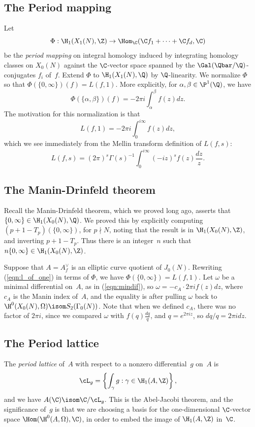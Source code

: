 \documentclass{report}
\begin{document}
\subsection{The Period mapping}
Let
$$
\Phi:\H_1(X_1(N),\Z) \to \Hom_\C(\C f_1 + \cdots + \C f_d,\C)
$$
be the {\em period mapping} on integral homology induced by
integrating homology classes on $X_0(N)$ against the $\C$-vector space
spanned by the $\Gal(\Qbar/\Q)$-conjugates $f_i$ of~$f$.
Extend $\Phi$ to $\H_1(X_1(N),\Q)$ by $\Q$-linearity.
We normalize
$\Phi$ so that $\Phi(\{0,\infty\})(f) = L(f,1)$.  More explicitly, for
$\alpha,\beta\in\P^1(\Q)$, we have
$$
  \Phi(\{\alpha,\beta\})(f) = -2\pi i \int_{\alpha}^{\beta} f(z) dz.
$$
The motivation for this normalization is that
\begin{equation}\label{eqn:l_of_one}
  L(f,1) = -2\pi i \int_{0}^{i\infty}  f(z) dz,
\end{equation}
which we see immediately from the Mellin transform definition of $L(f,s)$:
$$
  L(f,s) = (2\pi)^s\Gamma(s)^{-1}\int_{0}^{i\infty} (-iz)^s f(z) \frac{dz}{z}.
$$


\subsection{The Manin-Drinfeld theorem}
Recall the Manin-Drinfeld theorem, which we proved long ago, asserts
that $\{0,\infty\} \in \H_1(X_0(N),\Q)$.  We proved this by explicitly
computing $(p+1-T_p)(\{0,\infty\})$, for $p\nmid N$, noting that the
result is in $\H_1(X_0(N),\Z)$, and inverting $p+1-T_p$.  Thus there
is an integer~$n$ such that $n\{0,\infty\} \in \H_1(X_0(N),\Z)$.

Suppose that $A=A_f^{\vee}$ is an elliptic curve quotient of $J_0(N)$.
Rewriting (\ref{eqn:l_of_one}) in terms of $\Phi$, we have
$\Phi(\{0,\infty\}) = L(f,1)$.  Let $\omega$ be a minimal differential
on~$A$, as in (\ref{eqn:mindif}), so $\omega = -c_A \cdot 2\pi i
f(z)dz$, where $c_A$ is the Manin index of~$A$, and the equality is
after pulling $\omega$ back to $\H^0(X_0(N),\Omega) \isom
S_2(\Gamma_0(N))$.  Note that when we defined $c_A$, there was no
factor of $2\pi i$, since we compared $\omega$ with $f(q)
\frac{dq}{q}$, and $q=e^{2\pi i z}$, so $dq/q = 2\pi i dz.$

\subsection{The Period lattice}
The {\em period lattice} of~$A$ with respect to a nonzero differential~$g$ on~$A$ is
$$
\cL_g = \left\{\int_{\gamma} g : \gamma\in\H_1(A,\Z)\right\},
$$
and we have $A(\C)\isom \C/\cL_g$.  This is the Abel-Jacobi
theorem, and the significance of~$g$ is that we are choosing a basis
for the one-dimensional $\C$-vector space $\Hom(\H^0(A,\Omega),\C)$,
in order to embed the image of $\H_1(A,\Z)$ in~$\C$.
\end{document}
